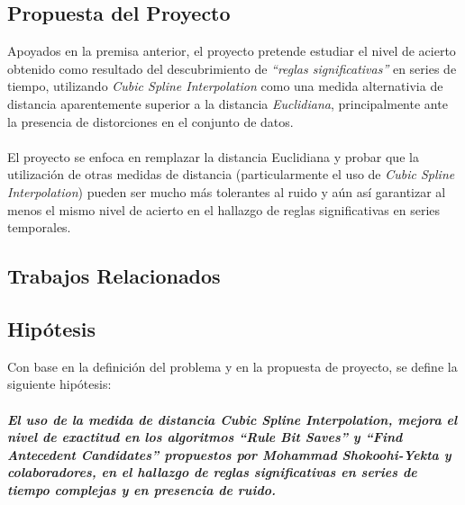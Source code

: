 \subsection{Propuesta del Proyecto}
Apoyados en la premisa anterior, el proyecto pretende estudiar el nivel de acierto obtenido como resultado del descubrimiento de \textit{\enquote{reglas significativas}} en series de tiempo, utilizando \textit{Cubic Spline Interpolation} como una medida alternativia de distancia aparentemente superior a la distancia \textit{Euclidiana}, principalmente ante la presencia de distorciones en el conjunto de datos.\\\\
El proyecto se enfoca en remplazar la distancia Euclidiana y probar que la utilizaci\'on de otras medidas de distancia (particularmente el uso de \textit{Cubic Spline Interpolation}) pueden ser mucho m\'as tolerantes al ruido y a\'un as\'i garantizar al menos el mismo nivel de acierto en el hallazgo de reglas significativas en series temporales.
\subsection{Trabajos Relacionados}
\subsection{Hip\'otesis}
Con base en la definici\'on del problema y en la propuesta de proyecto, se define la siguiente hip\'otesis:\\\\
\textbf{\textit{El uso de la medida de distancia \textit{Cubic Spline Interpolation}, mejora el nivel de exactitud en los algoritmos \textit{\textbf{\enquote{Rule Bit Saves}}} y \textit{\textbf{\enquote{Find Antecedent Candidates}}} propuestos por Mohammad Shokoohi-Yekta y colaboradores, en el hallazgo de reglas significativas en series de tiempo complejas y en presencia de ruido.}} 
